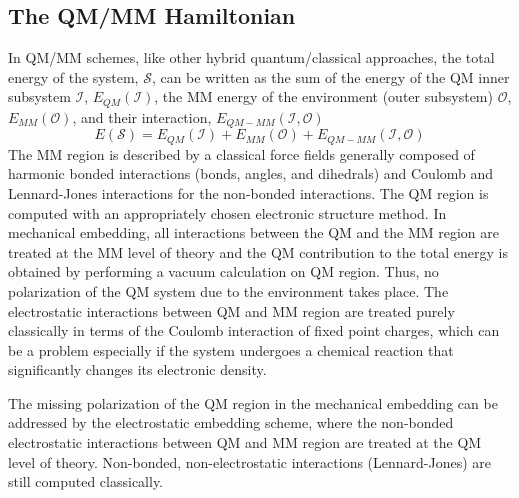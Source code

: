 \documentclass[journal=jctcce,manuscript=article,layout=traditional]{achemso}
\newcommand{\mc}[1]{\ensuremath{\mathcal{#1}}}
\begin{document}
\subsection{The QM/MM Hamiltonian}\label{sec:theory:qmmm}
In QM/MM schemes, like other hybrid quantum/classical approaches\cite{Tomasi81, Mennucci:2012ct, Curutchet2017}, the total energy of the system, $\mc{S}$, can be written as the sum of the energy of 
the QM inner subsystem $\mc{I}$, $E_{QM}(\mc{I})$, the MM energy of the environment (outer subsystem) $\mc{O}$, $E_{MM}(\mc{O})$, 
and their interaction, $E_{QM-MM}(\mc{I,O})$\cite{Senn:2009gk}
\begin{equation}
    E(\mc{S}) = E_{QM}(\mc{I}) + E_{MM}(\mc{O}) + E_{QM-MM}(\mc{I,O})
    \label{eq:QMMM}
\end{equation}
The MM region is described by a classical force fields generally composed of harmonic bonded interactions (bonds, angles, and dihedrals) and Coulomb and Lennard-Jones interactions for the non-bonded interactions.
The QM region is computed with an appropriately chosen electronic structure method.
%
In mechanical embedding, all interactions between the QM and the MM region are treated at the MM level of theory and the QM contribution to the total energy is obtained by performing a vacuum calculation on QM region.
Thus, no polarization of the QM system due to the environment takes place.
The electrostatic interactions  between QM and MM region are treated purely classically in terms of the Coulomb interaction of fixed point charges, which can be a problem especially if the system undergoes a chemical reaction that significantly changes its electronic density. 
%
%


The missing polarization of the QM region in the mechanical embedding can be addressed by the electrostatic embedding scheme, where the non-bonded electrostatic interactions between QM and MM region are treated at the QM level of theory.
Non-bonded, non-electrostatic interactions (Lennard-Jones) are still computed classically. 
\end{document}
